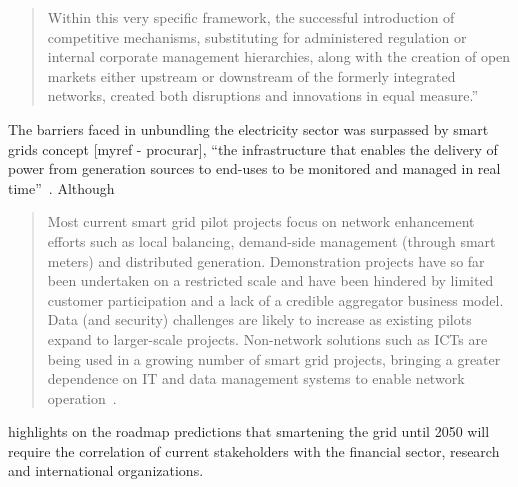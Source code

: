 
\begin{quotation}
Within this very specific framework, the successful introduction of competitive mechanisms, substituting for administered regulation or internal corporate management hierarchies, along with the creation of open markets either upstream or downstream of the formerly integrated networks, created both disruptions and innovations in equal measure.''~\cite{book:networks}
\end{quotation}

\medskip %
The barriers faced in unbundling the electricity sector was surpassed by smart grids concept [myref - procurar],
``the infrastructure that enables the delivery of power from generation sources to end-uses to be monitored and managed in real time''~\cite{iea2011}.
Although
\begin{quotation}
Most current smart grid pilot projects focus on network enhancement efforts such as local balancing, demand-side management (through smart meters) and distributed generation.
Demonstration projects have so far been undertaken on a restricted scale and have been hindered by limited customer participation and a lack of a credible aggregator business model.
Data (and security) challenges are likely to increase as existing pilots expand to larger-scale projects.
Non-network solutions such as ICTs are being used in a growing number of smart grid projects, bringing a greater dependence on IT and data management systems to enable network operation~\cite{iea2011}.
\end{quotation}

\citeauthor{iea2011} highlights on the roadmap predictions that smartening the grid until 2050 will require the correlation of current stakeholders with the financial sector, research and international organizations.


